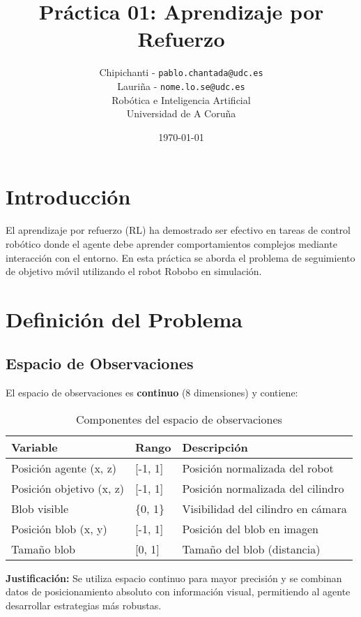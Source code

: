 \documentclass[12pt,a4paper]{article}
\title{\textbf{Práctica 01: Aprendizaje por Refuerzo}}
\author{
    Chipichanti -
    \texttt{pablo.chantada@udc.es}\\
    Lauriña -
    \texttt{nome.lo.se@udc.es}\\
    Robótica e Inteligencia Artificial\\
    Universidad de A Coruña
}
\date{\today}
\begin{document}
\maketitle


\section{Introducción}

El aprendizaje por refuerzo (RL) ha demostrado ser efectivo en tareas de control robótico donde el agente debe aprender comportamientos complejos mediante interacción con el entorno. En esta práctica se aborda el problema de seguimiento de objetivo móvil utilizando el robot Robobo en simulación.

\section{Definición del Problema}

\subsection{Espacio de Observaciones}

El espacio de observaciones es \textbf{continuo} (8 dimensiones) y contiene:

\begin{table}[H]
\centering
\begin{tabular}{@{}lll@{}}
\toprule
\textbf{Variable} & \textbf{Rango} & \textbf{Descripción} \\ \midrule
Posición agente (x, z) & [-1, 1] & Posición normalizada del robot \\
Posición objetivo (x, z) & [-1, 1] & Posición normalizada del cilindro \\
Blob visible & \{0, 1\} & Visibilidad del cilindro en cámara \\
Posición blob (x, y) & [-1, 1] & Posición del blob en imagen \\
Tamaño blob & [0, 1] & Tamaño del blob (distancia) \\ \bottomrule
\end{tabular}
\caption{Componentes del espacio de observaciones}
\end{table}

\textbf{Justificación:} Se utiliza espacio continuo para mayor precisión y se combinan datos de posicionamiento absoluto con información visual, permitiendo al agente desarrollar estrategias más robustas.
\end{document}
